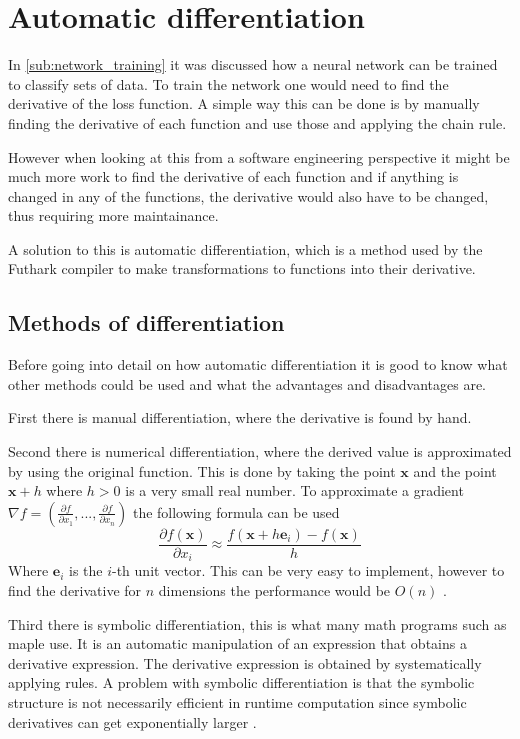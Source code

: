 \section{Automatic differentiation}%
\label{sec:autodiff}

In \autoref{sub:network_training} it was discussed how a neural network can be trained to classify sets of data. To train the network one would need to find the derivative of the loss function. A simple way this can be done is by manually finding the derivative of each function and use those
and applying the chain rule.

However when looking at this from a software engineering perspective it might be much more work to find the derivative of each function and if anything is changed in any of the functions, the derivative would also have to be changed, thus requiring more maintainance.

A solution to this is automatic differentiation, which is a method used by the Futhark compiler to make transformations to functions into their derivative.

\subsection{Methods of differentiation}

Before going into detail on how automatic differentiation it is good to know what other methods could be used and what the advantages and disadvantages are.

First there is manual differentiation, where the derivative is found by hand.

Second there is numerical differentiation, where the derived value is approximated by using the original function. This is done by taking the point $\bm{x}$ and the point $\bm{x}+h$ where $h>0$ is a very small real number. To approximate a gradient $\nabla f = \left(\frac{\partial f}{\partial x_1}, ..., \frac{\partial f}{\partial x_n} \right)$ the following formula can be used
$$\frac{\partial f(\bm{x})}{\partial x_i} \approx \frac{f(\bm{x} + h\bm{e}_i) - f(\bm{x})}{h}$$
Where $\bm{e}_i$ is the $i$-th unit vector. This can be very easy to implement, however to find the derivative for $n$ dimensions the performance would be $O(n)$ \cite{autodiff}.

Third there is symbolic differentiation, this is what many math programs such as maple use. It is an automatic manipulation of an expression that obtains a derivative expression. The derivative expression is obtained by systematically applying rules.
A problem with symbolic differentiation is that the symbolic structure is not necessarily efficient in runtime computation since symbolic derivatives can get exponentially larger
\cite{autodiff}.

